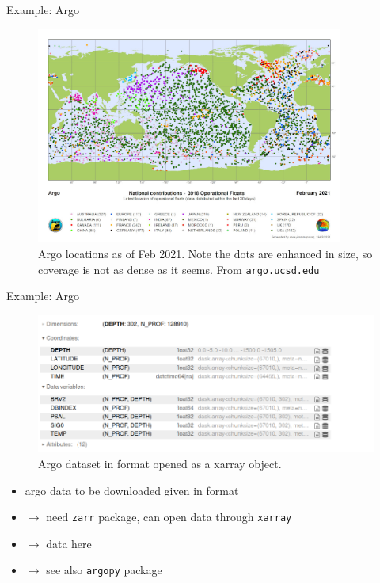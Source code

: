 \documentclass[xcolor=x11names,compress]{beamer}
\renewcommand{\(}{\begin{columns}}
\renewcommand{\)}{\end{columns}}
\newcommand{\<}[1]{\begin{column}{#1}}
\renewcommand{\>}{\end{column}}
\begin{document}

\begin{frame}{Example: Argo}

\begin{figure}
  \includegraphics[width=0.9\textwidth]{argo_location}
  \caption{Argo locations as of Feb 2021. Note the dots are enhanced in size, so
  coverage is not as dense as it seems. From \texttt{argo.ucsd.edu}}
\end{figure}

\end{frame}


\begin{frame}{Example: Argo}

\begin{figure}
  \includegraphics[width=\textwidth]{argo_dataset}
  \caption{Argo dataset in  format opened as a xarray object.}
\end{figure}

\begin{itemize}
  \item argo data to be downloaded given in  format
  \item[] $\to$ need \texttt{zarr} package, can open data through
  \texttt{xarray}
  \item[] $\to$  data here
  \item[] $\to$ see also \texttt{argopy} package
\end{itemize}

\end{frame}
\end{document}

